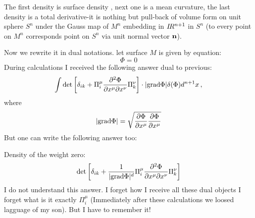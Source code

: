  The first density is surface density , next one is a mean curvature,
 the last density is a total derivative-it is nothing but pull-back of
 volume form on unit sphere $S^{n}$ under the Gauss map of $M^n$
 embedding in $I\!R^{n+1}$
 in $S^n$ (to every point on $M^n$ corresponds point on $S^n$ via
 unit normal vector ${\bf n}$).

Now we rewrite it in dual notations.
let surface $M$ is given by equation:
            $$
            \Phi=0
             $$
During calculations I received the following answer dual
to previous:
                     $$
                 \int
                 \det
                 \left[
                    \delta_{ik}+
                    \Pi^\mu_i
                 {\partial^2 \Phi\over \partial x^\mu\partial x^\nu}
                     \Pi^\nu_k
                     \right]
                     \cdot
                     |{\rm grad}\Phi|
                      \delta(\Phi)
                    d^{n+1}x\,,
                     $$
where
                      $$
 |{\rm grad}\Phi|=\sqrt
                       {
          {\partial\Phi\over \partial x^\mu}
            {\partial\Phi\over \partial x^\mu}
                   }
                    $$
But one can write the following answer too:

 Density of the weight zero:
                $$
                                \det
                 \left[
                    \delta_{ik}+
                      {1\over |{\rm grad}\Phi|^d}
                    \Pi^\mu_i
                 {\partial^2 \Phi\over \partial x^\mu\partial x^\nu}
                     \Pi^\nu_k
                     \right]
                     $$
          I do not understand this answer.
          I forget how I receive all these dual objects
          I forget what is it exactly $\Pi^\mu_i$
       (Immediately after these calculations we loosed lagguage
        of my son).
        But I have to remember it!
        


            \bye
